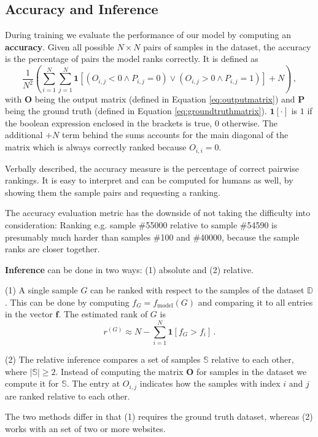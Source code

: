 \subsection{Accuracy and Inference}

During training we evaluate the performance of our model by computing an \textbf{accuracy}. Given all possible $N\times N$ pairs of samples in the dataset, the accuracy is the percentage of pairs the model ranks correctly. It is defined as \begin{equation}\label{eq:acc}
    \frac{1}{N^2}\left(\sum_{i=1}^N\sum_{j=1}^N\bm{1}\left[\left(O_{i,j}<0\land P_{i,j}=0\right)\lor\left(O_{i,j}>0\land P_{i,j}=1\right)\right]+N\right)\,,
\end{equation}with $\bm{O}$ being the output matrix (defined in Equation \ref{eq:outputmatrix}) and $\bm{P}$ being the ground truth (defined in Equation \ref{eq:groundtruthmatrix}). $\bm{1}\left[\cdot\right]$ is $1$ if the boolean expression enclosed in the brackets is true, $0$ otherwise. The additional $+N$ term behind the sums accounts for the main diagonal of the matrix which is always correctly ranked because $O_{i,i}=0$.

Verbally described, the accuracy measure is the percentage of correct pairwise rankings. It is easy to interpret and can be computed for humans as well, by showing them the sample pairs and requesting a ranking.

The accuracy evaluation metric has the downside of not taking the difficulty into consideration: Ranking e.g. sample \#55000 relative to sample \#54590 is presumably much harder than samples \#100 and \#40000, because the sample ranks are closer together.

\textbf{Inference} can be done in two ways: (1) absolute and (2) relative.

(1) A single sample $G$ can be ranked with respect to the samples of the dataset $\mathbb{D}$. This can be done by computing $f_G=f_\text{model}(G)$ and comparing it to all entries in the vector $\bm{f}$. The estimated rank of $G$ is \begin{equation}
    r^{(G)}\approx N-\sum_{i=1}^N\bm{1}\left[f_G>f_i\right]\,.
\end{equation}

(2) The relative inference compares a set of samples $\mathbb{S}$ relative to each other, where $\left\lvert\mathbb{S}\right\rvert\ge2$. Instead of computing the matrix $\bm{O}$ for samples in the dataset we compute it for $\mathbb{S}$. The entry at $O_{i,j}$ indicates how the samples with index $i$ and $j$ are ranked relative to each other.

The two methods differ in that (1) requires the ground truth dataset, whereas (2) works with an set of two or more websites.

